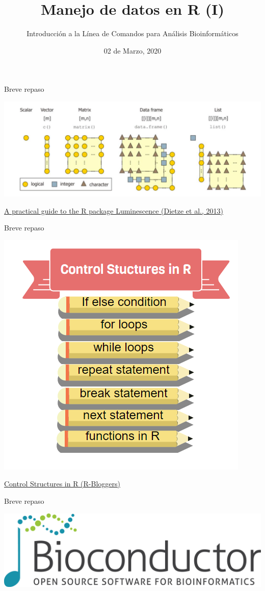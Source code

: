 \documentclass[ignorenonframetext,]{beamer}
\title{Manejo de datos en R (I)}
\author{Introducción a la Línea de Comandos para Análisis Bioinformáticos}
\date{02 de Marzo, 2020}
\begin{document}
\frame{\titlepage}

\begin{frame}{Breve repaso}
\protect\hypertarget{breve-repaso}{}

\includegraphics{r_tipos_datos.png}

\href{https://hal.archives-ouvertes.fr/hal-01846155/document}{A
practical guide to the R package Luminescence (Dietze et al., 2013)}

\end{frame}

\begin{frame}{Breve repaso}
\protect\hypertarget{breve-repaso-1}{}

\begin{center}\includegraphics[width=0.7\linewidth]{control_structures+in+R} \end{center}

\href{https://www.r-bloggers.com/control-structures-loops-in-r/}{Control
Structures in R (R-Bloggers)}

\end{frame}

\begin{frame}{Breve repaso}
\protect\hypertarget{breve-repaso-2}{}

\includegraphics{bioconductor_logo_rgb.jpg}

\end{frame}
\end{document}
